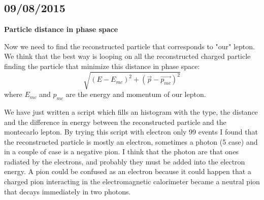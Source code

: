\subsection{09/08/2015}

\textbf{Particle distance in phase space}

Now we need to find the reconstructed particle that corresponds to "our" lepton. We think that the best way is looping on all the reconstructed charged particle finding the particle that minimize this distance in phase space:
\[ \sqrt{(E-E_{mc})^2 + (\vec{p}-\vec{p_{mc}})^2}\]
where $E_{mc}$ and $p_{mc}$ are the energy and momentum of our lepton.

We have just written a script which fills an histogram with the type, the distance and the difference in energy between the reconstructed particle and the montecarlo lepton.
By trying this script with electron only 99 events I found that the reconstructed particle is mostly an electron, sometimes a photon (5 case) and in a couple of case is a negative pion. I think that the photon are that ones radiated by the electrons, and probably they must be added into the electron energy. A pion could be confused as an electron because it could happen that a charged pion interacting in the electromagnetic calorimeter became a neutral pion that decays immediately in two photons.